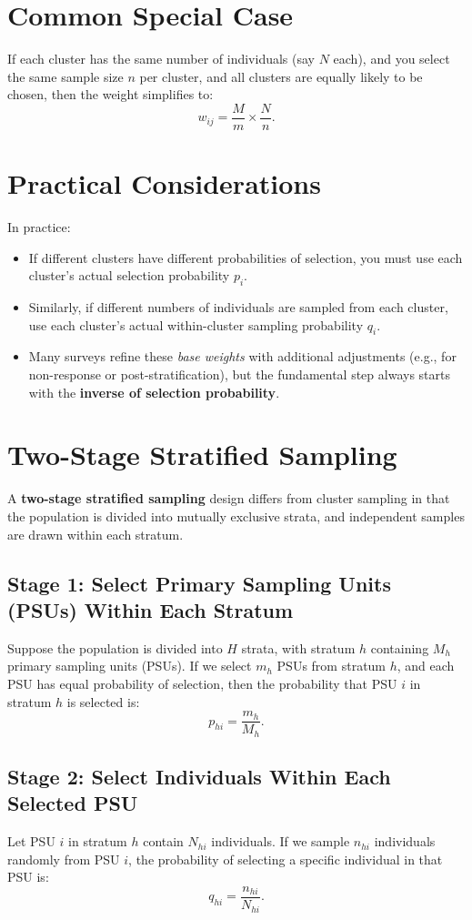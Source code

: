 \documentclass[12pt]{article}
\begin{document}
\section{Common Special Case}
If each cluster has the same number of individuals (say \( N \) each), and you select the same sample size \( n \) per cluster, and all clusters are equally likely to be chosen, then the weight simplifies to:
\[
w_{ij} = \frac{M}{m} \times \frac{N}{n}.
\]

\section{Practical Considerations}
In practice:
\begin{itemize}
    \item If different clusters have different probabilities of selection, you must use each cluster’s actual selection probability \( p_i \).
    \item Similarly, if different numbers of individuals are sampled from each cluster, use each cluster’s actual within-cluster sampling probability \( q_i \).
    \item Many surveys refine these \textit{base weights} with additional adjustments (e.g., for non-response or post-stratification), but the fundamental step always starts with the \textbf{inverse of selection probability}.
\end{itemize}

\section{Two-Stage Stratified Sampling}

A \textbf{two-stage stratified sampling} design differs from cluster sampling in that the population is divided into mutually exclusive strata, and independent samples are drawn within each stratum.

\subsection{Stage 1: Select Primary Sampling Units (PSUs) Within Each Stratum}
Suppose the population is divided into \( H \) strata, with stratum \( h \) containing \( M_h \) primary sampling units (PSUs). If we select \( m_h \) PSUs from stratum \( h \), and each PSU has equal probability of selection, then the probability that PSU \( i \) in stratum \( h \) is selected is:
\[
p_{hi} = \frac{m_h}{M_h}.
\]

\subsection{Stage 2: Select Individuals Within Each Selected PSU}
Let PSU \( i \) in stratum \( h \) contain \( N_{hi} \) individuals. If we sample \( n_{hi} \) individuals randomly from PSU \( i \), the probability of selecting a specific individual in that PSU is:
\[
q_{hi} = \frac{n_{hi}}{N_{hi}}.
\]
\end{document}
